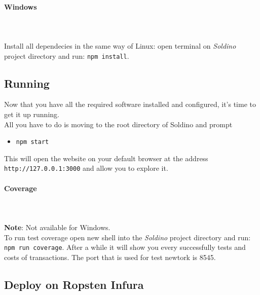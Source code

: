 \paragraph{Windows} \mbox{} \\ \mbox{} \\
Install all dependecies in the same way of Linux: open terminal on \textit{Soldino} project directory and run: \texttt{npm install}.

\subsection{Running}
Now that you have all the required software installed and configured, it's time to get it up running.\\
All you have to do is moving to the root directory of Soldino and prompt
\begin{itemize}
	\item[]\texttt{npm start}
\end{itemize}
This will open the website on your default browser at the address \texttt{http://127.0.0.1:3000} and allow you to explore it.
\paragraph{Coverage} \mbox{} \\ \mbox{} \\
\textbf{Note}: Not available for Windows. \\
To run test coverage open new shell into the \textit{Soldino} project directory and run: \texttt{npm run coverage}. After a while it will show you every successfully tests and costs of transactions. The port that is used for test newtork is 8545.
\subsection{Deploy on Ropsten Infura}


%
% 